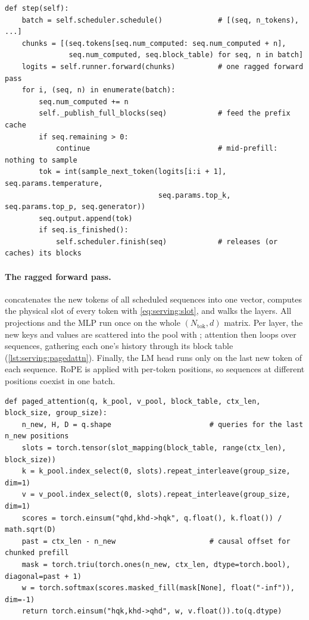 \begin{lstlisting}[caption={The engine step (abridged from llmsys/serving/engine.py).},label={lst:serving:step}]
def step(self):
    batch = self.scheduler.schedule()             # [(seq, n_tokens), ...]
    chunks = [(seq.tokens[seq.num_computed: seq.num_computed + n],
               seq.num_computed, seq.block_table) for seq, n in batch]
    logits = self.runner.forward(chunks)          # one ragged forward pass
    for i, (seq, n) in enumerate(batch):
        seq.num_computed += n
        self._publish_full_blocks(seq)            # feed the prefix cache
        if seq.remaining > 0:
            continue                              # mid-prefill: nothing to sample
        tok = int(sample_next_token(logits[i:i + 1], seq.params.temperature,
                                    seq.params.top_k, seq.params.top_p, seq.generator))
        seq.output.append(tok)
        if seq.is_finished():
            self.scheduler.finish(seq)            # releases (or caches) its blocks
\end{lstlisting}

\paragraph{The ragged forward pass.}  concatenates the new tokens of all
scheduled sequences into one vector, computes the physical slot of every token with
\cref{eq:serving:slot}, and walks the layers. All projections and the MLP run once on the whole
$(N_{\text{tok}},d)$ matrix. Per layer, the new keys and values are scattered into the pool with
; attention then loops over sequences, gathering each one's history through its
block table (\cref{lst:serving:pagedattn}). Finally, the LM head runs only on the last new token of
each sequence. RoPE is applied with per-token positions, so sequences at different positions coexist
in one batch.

\begin{lstlisting}[caption={Reference paged attention for one sequence.},label={lst:serving:pagedattn}]
def paged_attention(q, k_pool, v_pool, block_table, ctx_len, block_size, group_size):
    n_new, H, D = q.shape                       # queries for the last n_new positions
    slots = torch.tensor(slot_mapping(block_table, range(ctx_len), block_size))
    k = k_pool.index_select(0, slots).repeat_interleave(group_size, dim=1)
    v = v_pool.index_select(0, slots).repeat_interleave(group_size, dim=1)
    scores = torch.einsum("qhd,khd->hqk", q.float(), k.float()) / math.sqrt(D)
    past = ctx_len - n_new                      # causal offset for chunked prefill
    mask = torch.triu(torch.ones(n_new, ctx_len, dtype=torch.bool), diagonal=past + 1)
    w = torch.softmax(scores.masked_fill(mask[None], float("-inf")), dim=-1)
    return torch.einsum("hqk,khd->qhd", w, v.float()).to(q.dtype)
\end{lstlisting}

